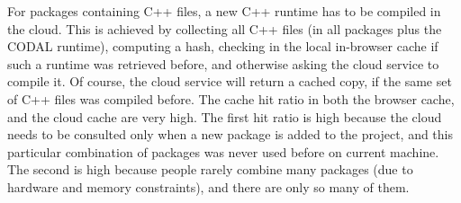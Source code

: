 For packages containing C++ files, a new C++ runtime has to be compiled in the cloud.
This is achieved by collecting all C++ files (in all packages plus the CODAL runtime),
computing a hash, checking in the local in-browser cache if such a runtime was retrieved
before, and otherwise asking the cloud service to compile it.
Of course, the cloud service will return a cached copy, if the same set of C++
files was compiled before. The cache hit ratio in both the browser cache,
and the cloud cache are very high. 
The first hit ratio is high because the cloud needs to be consulted
only when a new package is added to the project, and this particular combination 
of packages was never used before on current machine.
The second is high because people rarely combine many packages (due to
hardware and memory constraints), and there are only so many of them.
